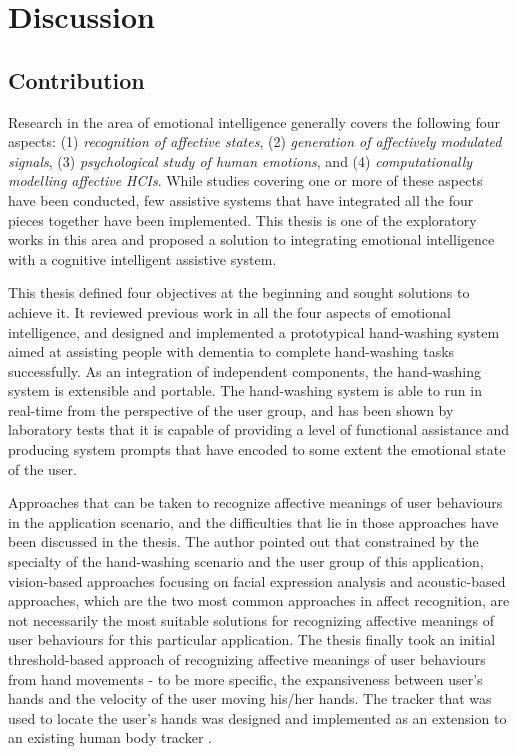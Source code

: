 \chapter{Discussion}
\label{chap:discuss}

\section{Contribution}

Research in the area of emotional intelligence generally covers the following four aspects: (1) \textit{recognition of affective states}, (2) \textit{generation of affectively modulated signals}, (3) \textit{psychological study of human emotions}, and (4) \textit{computationally modelling affective HCIs}. While studies covering one or more of these aspects have been conducted, few assistive systems that have integrated all the four pieces together have been implemented. This thesis is one of the exploratory works in this area and proposed a solution to integrating emotional intelligence with a cognitive intelligent assistive system. 

This thesis defined four objectives at the beginning and sought solutions to achieve it. It reviewed previous work in all the four aspects of emotional intelligence, and designed and implemented a prototypical hand-washing system aimed at assisting people with dementia to complete hand-washing tasks successfully. As an integration of independent components, the hand-washing system is extensible and portable. The hand-washing system is able to run in real-time from the perspective of the user group, and has been shown by laboratory tests that it is capable of providing a level of functional assistance and producing system prompts that have encoded to some extent the emotional state of the user.

Approaches that can be taken to recognize affective meanings of user behaviours in the application scenario, and the difficulties that lie in those approaches have been discussed in the thesis. The author pointed out that constrained by the specialty of the hand-washing scenario and the user group of this application, vision-based approaches focusing on facial expression analysis and acoustic-based approaches, which are the two most common approaches in affect recognition, are not necessarily the most suitable solutions for recognizing affective meanings of user behaviours for this particular application. The thesis finally took an initial threshold-based approach of recognizing affective meanings of user behaviours from hand movements - to be more specific, the expansiveness between user's hands and the velocity of the user moving his/her hands. The tracker that was used to locate the user's hands was designed and implemented as an extension to an existing human body tracker \cite{czarnuch2014}.

